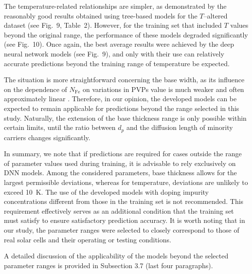 \documentclass[a4paper,fleqn]{cas-sc}
\begin{document}
The temperature-related relationships are simpler, as demonstrated by the reasonably good results 
obtained using tree-based models for the $T$--altered dataset (see Fig.~9, Table~2). 
However, for the training set that included $T$ values beyond the original range,
the performance of these models degraded significantly (see Fig.~10). 
Once again, the best average results were achieved by the deep neural network models (see Fig.~9), 
and only with their use can relatively accurate predictions beyond the training range of temperature be expected.

The situation is more straightforward concerning the base width, 
as its influence on the dependence of $N_\mathrm{Fe}$ on variations in PVPs value is much weaker and often approximately linear \cite{Olikh2025MSEB}. 
Therefore, in our opinion, the developed models can be expected to remain applicable 
for predictions beyond the range selected in this study. 
Naturally, the extension of the base thickness range is only possible within certain limits, 
until the ratio between $d_p$ and the diffusion length of minority carriers changes significantly.

In summary, we note that if predictions are required for cases outside the range of parameter values used during training, 
it is advisable to rely exclusively on DNN models. 
Among the considered parameters, base thickness allows for the largest permissible deviations, 
whereas for temperature, deviations are unlikely to exceed 10~K. 
The use of the developed models with doping impurity concentrations different 
from those in the training set is not recommended. 
This requirement effectively serves as an additional condition that the training set must satisfy 
to ensure satisfactory prediction accuracy. 
It is worth noting that in our study, the parameter ranges were selected to closely correspond 
to those of real solar cells and their operating or testing conditions.

A detailed discussion of the applicability of the models beyond the selected parameter ranges is provided in Subsection 3.7 (last four paragraphs).
\end{document}
